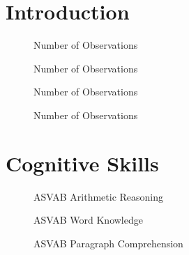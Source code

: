 \FloatBarrier\section{Introduction}
\begin{figure}[htp]\centering
\caption{Number of Observations}
\end{figure}

\begin{figure}[htp]\centering
\caption{Number of Observations}
\end{figure}

\begin{figure}[htp]\centering
\caption{Number of Observations}
\end{figure}

\begin{figure}[htp]\centering
\caption{Number of Observations}
\end{figure}

\FloatBarrier\section{Cognitive Skills}
\begin{figure}[htp]\centering
\caption{ASVAB Arithmetic Reasoning}
\end{figure}

\begin{figure}[htp]\centering
\caption{ASVAB Word Knowledge}
\end{figure}

\begin{figure}[htp]\centering
\caption{ASVAB Paragraph Comprehension}
\end{figure}

